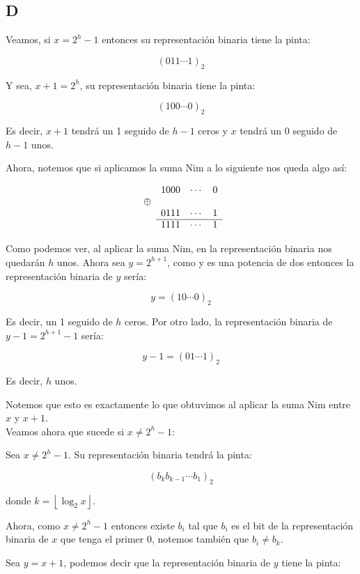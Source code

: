 \documentclass[a4paper]{article}
\begin{document}
\subsection{D}
Veamos, si $x = 2^h -1$ entonces su representación binaria tiene la pinta:


$$(011 \cdots 1)_{2}$$

Y sea, $x+1 = 2^h$, su representación binaria tiene la pinta:

$$(100 \cdots 0)_{2}$$

Es decir, $x+1$ tendrá un 1 seguido de $h-1$ ceros y $x$ tendrá un 0 seguido de $h-1$ unos.

Ahora, notemos que si aplicamos la suma Nim a lo siguiente nos queda algo así:

\begin{equation}
\begin{array}{llll}
& 1000 & \cdots & 0\\
\oplus \\
& 0111 & \cdots &1\\
\cline{2-4}
& 1111 & \cdots & 1
\end{array}
\end{equation}

Como podemos ver, al aplicar la suma Nim, en la representación binaria nos quedarán $h$ unos. Ahora sea $y = 2^{h+1}$, como y es una potencia de dos entonces la representación binaria de $y$ sería:

$$y = (10 \cdots 0)_{2}$$

Es decir, un 1 seguido de $h$ ceros. Por otro lado, la representación binaria de $y-1 = 2^{h+1} -1 $ sería:

$$y-1 = (01 \cdots 1)_{2}$$

Es decir, $h$ unos.

Notemos que esto es exactamente lo que obtuvimos al aplicar la suma Nim entre $x$ y $x+1$.\\

Veamos ahora que sucede si $x \not= 2^h -1$:

Sea $x\not= 2^h -1$. Su representación binaria tendrá la pinta:

$$(b_{k} b_{k-1}  \cdots b_{1})_{2}$$

donde $k = \left \lfloor \log_2{x} \right \rfloor$.

Ahora, como $x\not= 2^h -1$ entonces existe $b_{i}$ tal que $b_{i}$ es el bit de la representación binaria de $x$ que tenga el primer 0, notemos también que $b_{i} \not= b_{k} $.

Sea $y = x + 1$, podemos decir que la representación binaria de $y$ tiene la pinta:
\end{document}
